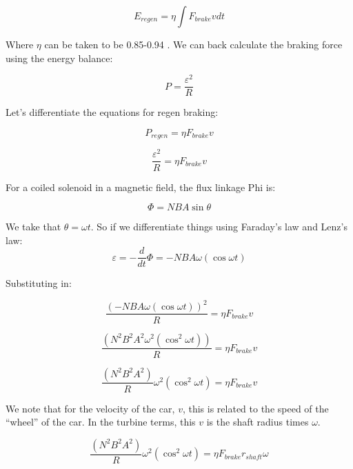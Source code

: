 \documentclass[masters]{ucbthesis}
\renewcommand{\_}{\kern-1.5pt\textunderscore\kern-1.5pt}
\begin{document}
\begin{equation*}
	E_{regen} = \eta \int F_{brake} v dt
\end{equation*}

Where $\eta$ can be taken to be 0.85-0.94 \citep{zhang2022research}. We 
can back calculate the braking force using the energy balance:

\begin{equation*}
	P = \frac{\varepsilon^2}{R}
\end{equation*}

Let's differentiate the equations for regen braking:

\begin{equation*}
	P_{regen} = \eta F_{brake} v 
\end{equation*}

\begin{equation*}
	\frac{\varepsilon^2}{R} = \eta F_{brake} v 
\end{equation*}

For a coiled solenoid in a magnetic field, the flux linkage Phi is:

\begin{equation*}
	\Phi = N B A \sin \theta
\end{equation*}

We take that $\theta = \omega t$. So if we differentiate things using 
Faraday's law and Lenz's law:
\begin{equation*}
	\varepsilon = -\frac{d}{dt}\Phi = - N B A \omega (\cos \omega t)
\end{equation*}


Substituting in:


\begin{equation*}
	\frac{(- N B A \omega (\cos \omega t))^2}{R} = \eta F_{brake} v 
\end{equation*}

\begin{equation*}
	\frac{( N^2 B^2 A^2 \omega^2 (\cos^2 \omega t))}{R} = \eta F_{brake} v 
\end{equation*}


\begin{equation*}
	\frac{( N^2 B^2 A^2 )}{R}\omega^2 (\cos^2 \omega t) = \eta F_{brake} v 
\end{equation*}

We note that for the velocity of the car, $v$, this is related to 
the speed of the ``wheel'' of the car. In the turbine terms, this 
$v$ is the shaft radius times $\omega$.

\begin{equation*}
	\frac{( N^2 B^2 A^2 )}{R}\omega^2 (\cos^2 \omega t) = \eta F_{brake} r_{shaft} \omega
\end{equation*}
\end{document}
